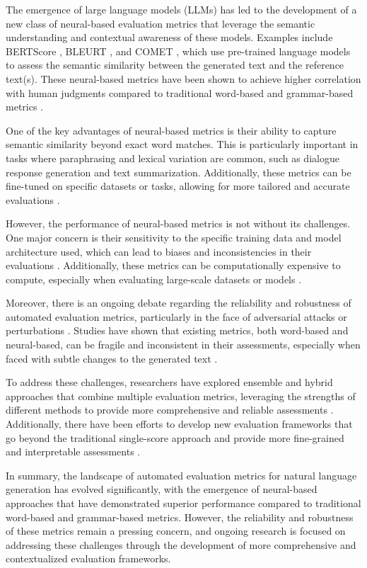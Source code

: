 \documentclass[11pt]{article}
\begin{document}
The emergence of large language models (LLMs) \cite{ref90} has led to the development of a new class of neural-based evaluation metrics that leverage the semantic understanding and contextual awareness of these models. Examples include BERTScore \cite{ref113}, BLEURT \cite{ref114}, and COMET \cite{ref115}, which use pre-trained language models to assess the semantic similarity between the generated text and the reference text(s). These neural-based metrics have been shown to achieve higher correlation with human judgments compared to traditional word-based and grammar-based metrics \cite{ref116}.

One of the key advantages of neural-based metrics is their ability to capture semantic similarity beyond exact word matches. This is particularly important in tasks where paraphrasing and lexical variation are common, such as dialogue response generation and text summarization. Additionally, these metrics can be fine-tuned on specific datasets or tasks, allowing for more tailored and accurate evaluations \cite{ref90}.

However, the performance of neural-based metrics is not without its challenges. One major concern is their sensitivity to the specific training data and model architecture used, which can lead to biases and inconsistencies in their evaluations \cite{ref117}. Additionally, these metrics can be computationally expensive to compute, especially when evaluating large-scale datasets or models \cite{ref118}.

Moreover, there is an ongoing debate regarding the reliability and robustness of automated evaluation metrics, particularly in the face of adversarial attacks or perturbations \cite{ref119}. Studies have shown that existing metrics, both word-based and neural-based, can be fragile and inconsistent in their assessments, especially when faced with subtle changes to the generated text \cite{ref120}.

To address these challenges, researchers have explored ensemble and hybrid approaches that combine multiple evaluation metrics, leveraging the strengths of different methods to provide more comprehensive and reliable assessments \cite{ref116}. Additionally, there have been efforts to develop new evaluation frameworks that go beyond the traditional single-score approach and provide more fine-grained and interpretable assessments \cite{ref121,ref122}.

In summary, the landscape of automated evaluation metrics for natural language generation has evolved significantly, with the emergence of neural-based approaches that have demonstrated superior performance compared to traditional word-based and grammar-based metrics. However, the reliability and robustness of these metrics remain a pressing concern, and ongoing research is focused on addressing these challenges through the development of more comprehensive and contextualized evaluation frameworks.
\end{document}
